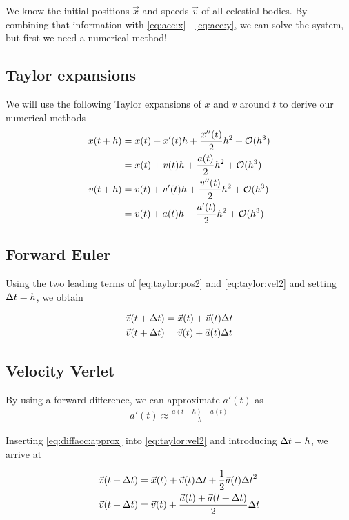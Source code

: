 \documentclass[a4paper]{article}
\begin{document}
We know the initial positions $\vec{x}$ and speeds $\vec{v}$ of all celestial bodies. By combining that information with \ref{eq:acc:x} - \ref{eq:acc:y}, we can solve the system, but first we need a numerical method!




\subsection{Taylor expansions}
We will use the following Taylor expansions of $x$ and $v$ around $t$ to derive our numerical methods
\begin{align}
    x(t + h) &= x(t) + x'(t) h + \frac{x''(t)}{2} h^2 + {\mathcal{O}}(h^3) \label{eq:taylor:pos1}\\
    &= x(t) + v(t) h + \frac{a(t)}{2} h^2 + {\mathcal{O}}(h^3) \label{eq:taylor:pos2} \\
    v(t + h) &= v(t) + v'(t) h + \frac{v''(t)}{2} h^2 + {\mathcal{O}}(h^3) \label{eq:taylor:vel1} \\
    &= v(t) + a(t) h + \frac{a'(t)}{2} h^2 + {\mathcal{O}}(h^3) \label{eq:taylor:vel2}
\end{align}

\subsection{Forward Euler}
Using the two leading terms of \ref{eq:taylor:pos2} and \ref{eq:taylor:vel2} and setting ${\Delta t} = h$, we obtain

\begin{align}
    \vec{x}(t + {\Delta t}) &= \vec{x}(t) + \vec{v}(t){\Delta t}  \label{eq:forwardeuler:pos} \\
    \vec{v}(t + {\Delta t}) &= \vec{v}(t) + \vec{a}(t){\Delta t} \label{eq:forwardeuler:vel}
\end{align}

\subsection{Velocity Verlet}

By using a forward difference, we can approximate $a'(t)$ as
\begin{align}
    a'(t) \approx \frac{a(t+h) - a(t)}{h} \label{eq:diffacc:approx}
\end{align}

Inserting \ref{eq:diffacc:approx} into \ref{eq:taylor:vel2} and introducing ${\Delta t} = h$, we arrive at

\begin{align}
\vec{x}(t + {\Delta t}) &= \vec{x}(t) + \vec{v}(t){\Delta t} + \frac{1}{2} \vec{a}(t) {\Delta t}^2 \label{eq:velverlet:pos} \\
\vec{v}(t + {\Delta t}) &= \vec{v}(t) + \frac{\vec{a}(t) + \vec{a}(t + {\Delta t})}{2} {\Delta t} \label{eq:velverlet:vel}
\end{align}
\end{document}
